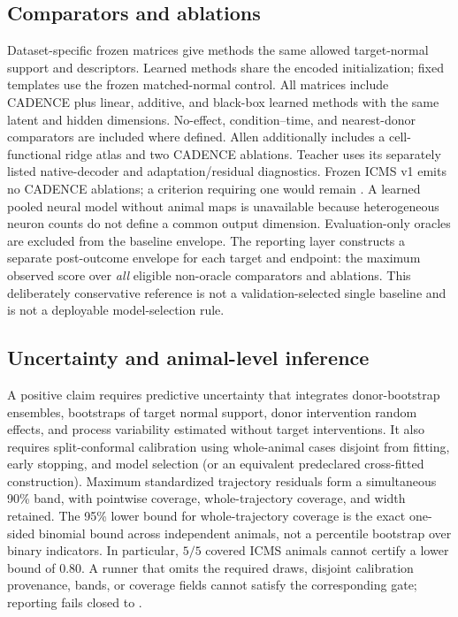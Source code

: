 \documentclass[11pt]{article}
\begin{document}
\subsection{Comparators and ablations}

Dataset-specific frozen matrices give methods the same allowed target-normal
support and descriptors. Learned methods share the encoded initialization;
fixed templates use the frozen matched-normal control. All matrices include
CADENCE plus linear, additive, and black-box learned methods with the same
latent and hidden dimensions. No-effect, condition--time, and nearest-donor
comparators are included where defined. Allen additionally includes a
cell-functional ridge atlas and two CADENCE ablations. Teacher uses its
separately listed native-decoder and adaptation/residual diagnostics. Frozen
ICMS v1 emits no CADENCE ablations; a criterion requiring one would remain
\NotEvaluated{}. A learned pooled neural model without animal maps is
unavailable because heterogeneous neuron counts do not define a common output
dimension. Evaluation-only oracles are excluded from the baseline envelope. The reporting
layer constructs a separate post-outcome envelope for each target and endpoint:
the maximum observed score over \emph{all} eligible non-oracle comparators and
ablations. This deliberately conservative reference is not a
validation-selected single baseline and is not a deployable model-selection
rule.

\subsection{Uncertainty and animal-level inference}

A positive claim requires predictive uncertainty that integrates
donor-bootstrap ensembles, bootstraps of target normal support, donor
intervention random effects, and process variability estimated without target
interventions. It also requires split-conformal calibration using whole-animal
cases disjoint from fitting, early stopping, and model selection (or an
equivalent predeclared cross-fitted construction). Maximum standardized
trajectory residuals form a simultaneous 90\% band, with pointwise coverage,
whole-trajectory coverage, and width retained. The 95\% lower bound for
whole-trajectory coverage is the exact one-sided binomial bound across
independent animals, not a percentile bootstrap over binary indicators. In
particular, \(5/5\) covered ICMS animals cannot certify a lower bound of 0.80.
A runner that omits the required draws, disjoint calibration provenance, bands,
or coverage fields cannot satisfy the corresponding gate; reporting fails
closed to \NotEvaluated{}.
\end{document}
